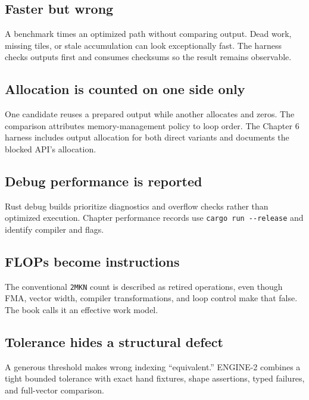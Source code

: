 \subsection{Faster but wrong}\label{faster-but-wrong}

A benchmark times an optimized path without comparing output. Dead work,
missing tiles, or stale accumulation can look exceptionally fast. The
harness checks outputs first and consumes checksums so the result
remains observable.

\subsection{Allocation is counted on one side
only}\label{allocation-is-counted-on-one-side-only}

One candidate reuses a prepared output while another allocates and
zeros. The comparison attributes memory-management policy to loop order.
The Chapter 6 harness includes output allocation for both direct
variants and documents the blocked API's allocation.

\subsection{Debug performance is
reported}\label{debug-performance-is-reported}

Rust debug builds prioritize diagnostics and overflow checks rather than
optimized execution. Chapter performance records use
\texttt{cargo\ run\ -\/-release} and identify compiler and flags.

\subsection{FLOPs become
instructions}\label{flops-become-instructions}

The conventional \texttt{2MKN} count is described as retired operations,
even though FMA, vector width, compiler transformations, and loop
control make that false. The book calls it an effective work model.

\subsection{Tolerance hides a structural
defect}\label{tolerance-hides-a-structural-defect}

A generous threshold makes wrong indexing ``equivalent.'' ENGINE-2
combines a tight bounded tolerance with exact hand fixtures, shape
assertions, typed failures, and full-vector comparison.

